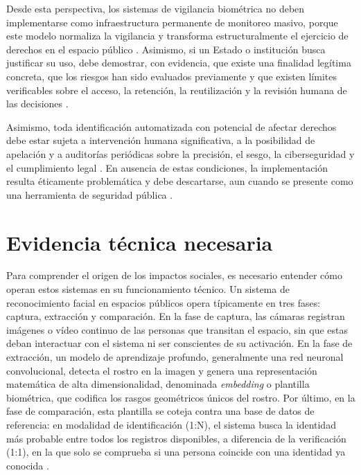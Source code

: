 \documentclass[11pt, a4paper]{article}
\begin{document}
Desde esta perspectiva, los sistemas de vigilancia biométrica no deben implementarse como infraestructura permanente de monitoreo masivo, porque este modelo normaliza la vigilancia y transforma estructuralmente el ejercicio de derechos en el espacio público \citep{schmechel2021, lyon2021}. Asimismo, si un Estado o institución busca justificar su uso, debe demostrar, con evidencia, que existe una finalidad legítima concreta, que los riesgos han sido evaluados previamente y que existen límites verificables sobre el acceso, la retención, la reutilización y la revisión humana de las decisiones \citep{gikay2023, silva2020}.

Asimismo, toda identificación automatizada con potencial de afectar derechos debe estar sujeta a intervención humana significativa, a la posibilidad de apelación y a auditorías periódicas sobre la precisión, el sesgo, la ciberseguridad y el cumplimiento legal \citep{martinez2024, grother2019}. En ausencia de estas condiciones, la implementación resulta éticamente problemática y debe descartarse, aun cuando se presente como una herramienta de seguridad pública \citep{schmechel2021, ploeg2003}.

\section{Evidencia técnica necesaria}

Para comprender el origen de los impactos sociales, es necesario entender cómo operan estos sistemas en su funcionamiento técnico. Un sistema de reconocimiento facial en espacios públicos opera típicamente en tres fases: captura, extracción y comparación. En la fase de captura, las cámaras registran imágenes o vídeo continuo de las personas que transitan el espacio, sin que estas deban interactuar con el sistema ni ser conscientes de su activación. En la fase de extracción, un modelo de aprendizaje profundo, generalmente una red neuronal convolucional, detecta el rostro en la imagen y genera una representación matemática de alta dimensionalidad, denominada \textit{embedding} o plantilla biométrica, que codifica los rasgos geométricos únicos del rostro. Por último, en la fase de comparación, esta plantilla se coteja contra una base de datos de referencia: en modalidad de identificación (1:N), el sistema busca la identidad más probable entre todos los registros disponibles, a diferencia de la verificación (1:1), en la que solo se comprueba si una persona coincide con una identidad ya conocida \citep{silva2020, grother2019}.
\end{document}
